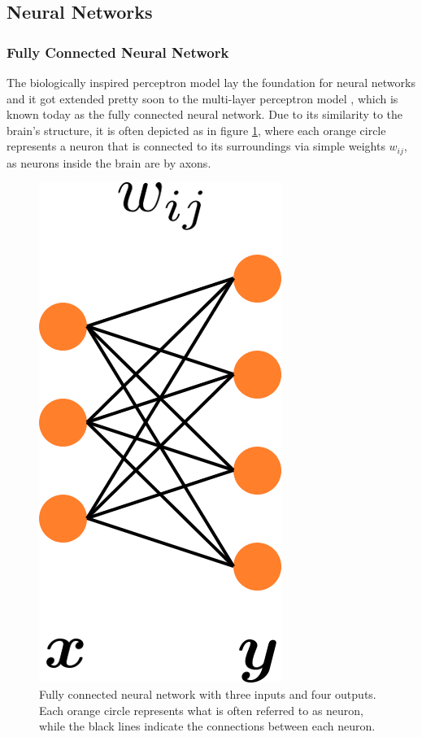 \subsection{Neural Networks}
\label{sec::321_nn}
\cite{weng1992cresceptron} %
\cite{krizhevsky2012imagenet} %
\subsubsection{Fully Connected Neural Network}
The biologically inspired perceptron model \cite{viglione19704} lay the foundation for neural networks and it got extended pretty soon to the multi-layer perceptron model
\cite{ivakhnenko1971polynomial}, which is known today as the fully connected neural network. Due to its similarity to the brain's structure, it is often depicted as in figure \ref{fig::321_fully_connected}, where each orange circle represents a neuron that is connected to its surroundings via simple weights $w_{ij}$, as neurons inside the brain are by axons.
\begin{figure}[h]
	\centering
	\includegraphics[scale=.28]{chapters/03_background/img/fully_connected.png}
	\caption{Fully connected neural network with three inputs and four outputs. Each orange circle represents what is often referred to as neuron, while the black lines indicate the connections between each neuron.}
	\label{fig::321_fully_connected}
\end{figure}
